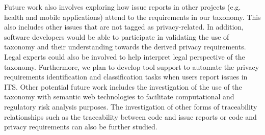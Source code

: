 Future work also involves exploring how issue reports in other projects (e.g. health and mobile applications) attend to the requirements in our taxonomy. This also includes other issues that are not tagged as privacy-related. In addition, software developers would be able to participate in validating the use of taxonomy and their understanding towards the derived privacy requirements. Legal experts could also be involved to help interpret legal perspective of the taxonomy. Furthermore, we plan to develop tool support to automate the privacy requirements identification and classification tasks when users report issues in ITS. Other potential future work includes the investigation of the use of the taxonomy with semantic web technologies to facilitate computational and regulatory risk analysis purposes. The investigation of other forms of traceability relationships such as the traceability between code and issue reports or code and privacy requirements can also be further studied. 



